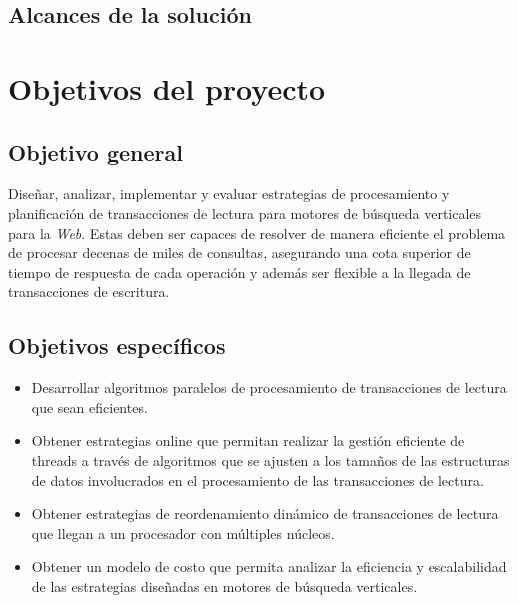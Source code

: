 \subsection{Alcances de la solución}
\label{intro:alcancesdelasolucion}

\section{Objetivos del proyecto}
\label{intro:objetivosysolucion}



\subsection{Objetivo general}
\label{intro:objetivogeneral}
Diseñar, analizar, implementar y evaluar estrategias de procesamiento y planificación de transacciones de lectura para motores de búsqueda verticales para la \textit{Web}. Estas deben ser capaces de resolver de manera eficiente el problema de procesar decenas de miles de consultas, asegurando una cota superior de tiempo de respuesta de cada operación y además ser flexible a la llegada de transacciones de escritura. 


\subsection{Objetivos específicos}
\label{intro:objetivosespecificos}
\begin{itemize}	
	\item Desarrollar algoritmos paralelos de procesamiento de transacciones de lectura que sean eficientes.
	
	\item Obtener estrategias online que permitan realizar la gestión eficiente de threads a través de algoritmos que se ajusten a los tamaños de las estructuras de datos involucrados en el procesamiento de las transacciones de lectura.
    
    \item Obtener estrategias de reordenamiento dinámico de transacciones de lectura que llegan a un procesador con múltiples núcleos.
    
    \item Obtener un modelo de costo que permita analizar la eficiencia y escalabilidad de las estrategias diseñadas en motores de búsqueda verticales.
\end{itemize}